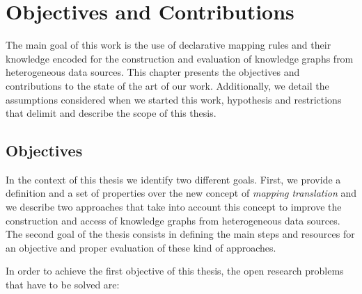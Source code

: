 \chapter{Objectives and Contributions}
\label{chap:objectives}
The main goal of this work is the use of declarative mapping rules and their knowledge encoded for the construction and evaluation of knowledge graphs from heterogeneous data sources. This chapter presents the objectives and contributions to the state of the art of our work. Additionally, we detail the assumptions considered when we started this work, hypothesis and restrictions that delimit and describe the scope of this thesis.

\section{Objectives}
In the context of this thesis we identify two different goals. First, we provide a definition and a set of properties over the new concept of \textit{mapping translation} and we describe two approaches that take into account this concept to improve the construction and access of knowledge graphs from heterogeneous data sources. The second goal of the thesis consists in defining the main steps and resources for an objective and proper evaluation of these kind of approaches.

In order to achieve the first objective of this thesis, the open research problems that have to be solved are:

